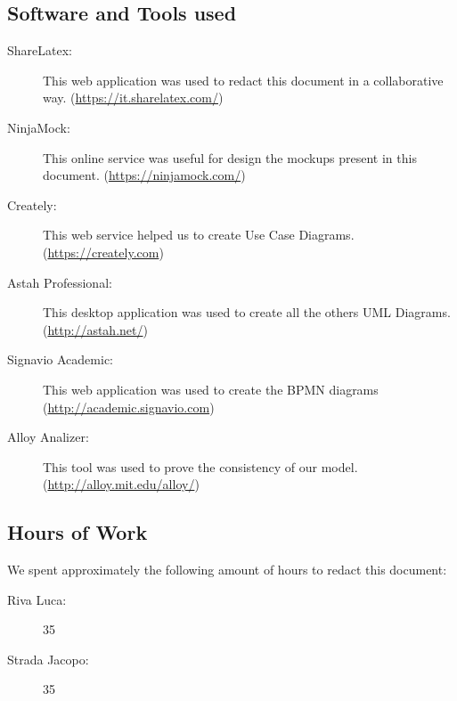 \documentclass[a4paper]{article}
\begin{document}
\subsection{Software and Tools used}

\begin{description}
\item[ShareLatex:] This web application was used to redact this document in a collaborative way. 
\newline (\url{https://it.sharelatex.com/})
\item[NinjaMock:] This online service was useful for design the mockups present in this document.
\newline (\url{https://ninjamock.com/})
\item[Creately:] This web service helped us to create Use Case Diagrams.
\newline (\url{https://creately.com})
\item[Astah Professional:] This desktop application was used to create all the others UML Diagrams.
\newline (\url{http://astah.net/})
\item[Signavio Academic:] This web application was used to create the BPMN diagrams
\newline (\url{http://academic.signavio.com})
\item[Alloy Analizer:] This tool was used to prove the consistency of our model.
\newline (\url{http://alloy.mit.edu/alloy/})
\end{description}

\subsection{Hours of Work}
We spent approximately the following amount of hours to redact this document:
\begin{description}
\item[Riva Luca:] 35
\item[Strada Jacopo:] 35
\end{description}
\end{document}
